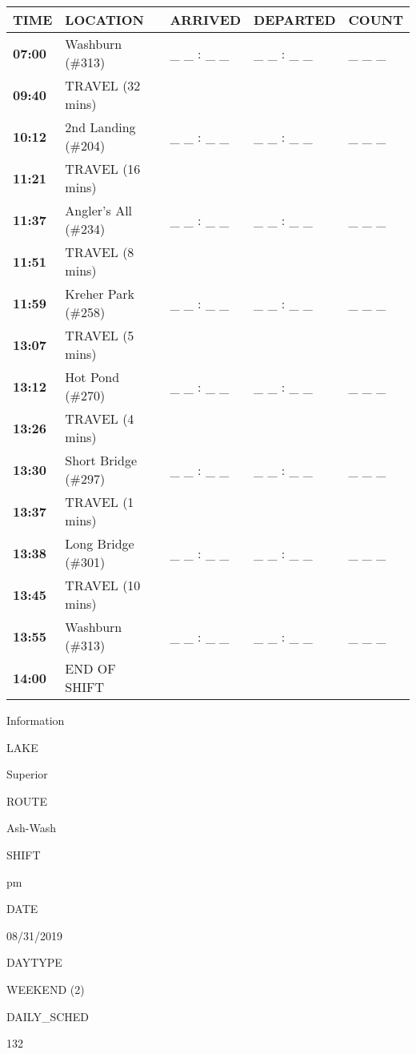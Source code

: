 \documentclass[]{article}
\begin{document}
\begin{tabular}{>{\bfseries}lllll}
\toprule
\textbf{TIME} & \textbf{LOCATION} & \textbf{ARRIVED} & \textbf{DEPARTED} & \textbf{COUNT}\\
\midrule
07:00 & Washburn (\#313) & \_ \_ : \_ \_ & \_ \_ : \_ \_ & \_ \_ \_\\
09:40 & TRAVEL (32 mins) &  &  & \\
10:12 & 2nd Landing (\#204) & \_ \_ : \_ \_ & \_ \_ : \_ \_ & \_ \_ \_\\
11:21 & TRAVEL (16 mins) &  &  & \\
11:37 & Angler's All (\#234) & \_ \_ : \_ \_ & \_ \_ : \_ \_ & \_ \_ \_\\
11:51 & TRAVEL (8 mins) &  &  & \\
11:59 & Kreher Park (\#258) & \_ \_ : \_ \_ & \_ \_ : \_ \_ & \_ \_ \_\\
13:07 & TRAVEL (5 mins) &  &  & \\
13:12 & Hot Pond (\#270) & \_ \_ : \_ \_ & \_ \_ : \_ \_ & \_ \_ \_\\
13:26 & TRAVEL (4 mins) &  &  & \\
13:30 & Short Bridge (\#297) & \_ \_ : \_ \_ & \_ \_ : \_ \_ & \_ \_ \_\\
13:37 & TRAVEL (1 mins) &  &  & \\
13:38 & Long Bridge (\#301) & \_ \_ : \_ \_ & \_ \_ : \_ \_ & \_ \_ \_\\
13:45 & TRAVEL (10 mins) &  &  & \\
13:55 & Washburn (\#313) & \_ \_ : \_ \_ & \_ \_ : \_ \_ & \_ \_ \_\\
14:00 & END OF SHIFT &  &  & \\
\bottomrule
\end{tabular}\newpage

Information

LAKE

Superior

ROUTE

Ash-Wash

SHIFT

pm

DATE

08/31/2019

DAYTYPE

WEEKEND (2)

DAILY\_SCHED

132

\vspace{24pt}
\end{document}
